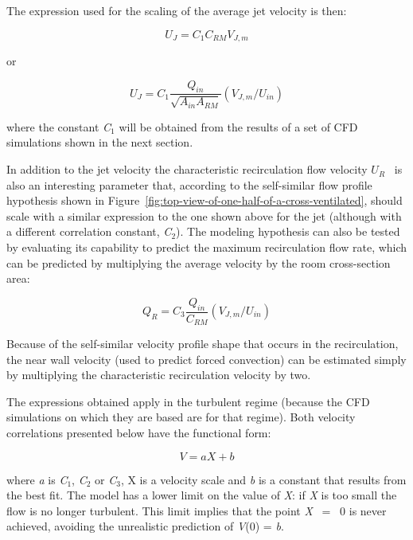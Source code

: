 The expression used for the scaling of the average jet velocity is then:

\begin{equation}
{U_J} = {C_1}{C_{RM}}{V_{J,m}}
\end{equation}

or

\begin{equation}
{U_J} = {C_1}\frac{{{Q_{in}}}}{{\sqrt {{A_{in}}{A_{RM}}} }}\left( {{V_{J,m}}/{U_{in}}} \right)
\end{equation}

where the constant \emph{C}\(_{1}\) will be obtained from the results of a set of CFD simulations shown in the next section.

In addition to the jet velocity the characteristic recirculation flow velocity \({U_R}\) ~is also an interesting parameter that, according to the self-similar flow profile hypothesis shown in Figure~\ref{fig:top-view-of-one-half-of-a-cross-ventilated}, should scale with a similar expression to the one shown above for the jet (although with a different correlation constant, \emph{C}\(_{2}\)). The modeling hypothesis can also be tested by evaluating its capability to predict the maximum recirculation flow rate, which can be predicted by multiplying the average velocity by the room cross-section area:

\begin{equation}
{Q_R} = {C_3}\frac{{{Q_{in}}}}{{{C_{RM}}}}\left( {{V_{J,m}}/{U_{in}}} \right)
\end{equation}

Because of the self-similar velocity profile shape that occurs in the recirculation, the near wall velocity (used to predict forced convection) can be estimated simply by multiplying the characteristic recirculation velocity by two.

The expressions obtained apply in the turbulent regime (because the CFD simulations on which they are based are for that regime). Both velocity correlations presented below have the functional form:

\begin{equation}
V = aX + b
\end{equation}

where \emph{a} is \emph{C}\(_{1}\), \emph{C}\(_{2}\) or \emph{C}\(_{3}\), X is a velocity scale and \emph{b} is a constant that results from the best fit. The model has a lower limit on the value of \emph{X}: if \emph{X} is too small the flow is no longer turbulent. This limit implies that the point \emph{X}~ = ~0 is never achieved, avoiding the unrealistic prediction of \emph{V}(0) = \emph{b}.

